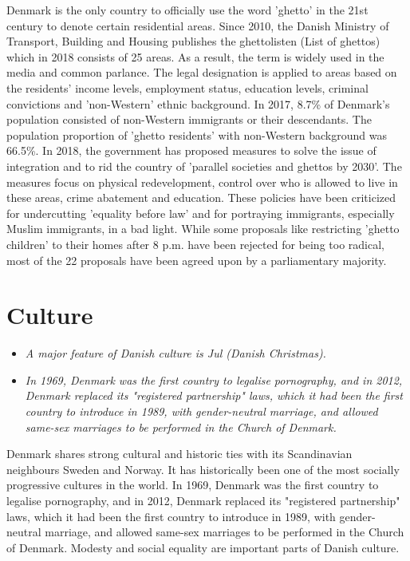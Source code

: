 Denmark is the only country to officially use the word 'ghetto' in the
21st century to denote certain residential areas. Since 2010, the Danish
Ministry of Transport, Building and Housing publishes the ghettolisten
(List of ghettos) which in 2018 consists of 25 areas. As a result, the
term is widely used in the media and common parlance. The legal
designation is applied to areas based on the residents' income levels,
employment status, education levels, criminal convictions and
'non-Western' ethnic background. In 2017, 8.7\% of Denmark's population
consisted of non-Western immigrants or their descendants. The population
proportion of 'ghetto residents' with non-Western background was 66.5\%.
In 2018, the government has proposed measures to solve the issue of
integration and to rid the country of 'parallel societies and ghettos by
2030'. The measures focus on physical redevelopment, control over who is
allowed to live in these areas, crime abatement and education. These
policies have been criticized for undercutting 'equality before law' and
for portraying immigrants, especially Muslim immigrants, in a bad light.
While some proposals like restricting 'ghetto children' to their homes
after 8 p.m. have been rejected for being too radical, most of the 22
proposals have been agreed upon by a parliamentary majority.

\section{Culture}\label{culture}

\begin{itemize}
\item
  \emph{A major feature of Danish culture is Jul (Danish Christmas).}
\item
  \emph{In 1969, Denmark was the first country to legalise pornography,
  and in 2012, Denmark replaced its "registered partnership" laws, which
  it had been the first country to introduce in 1989, with
  gender-neutral marriage, and allowed same-sex marriages to be
  performed in the Church of Denmark.}
\end{itemize}

Denmark shares strong cultural and historic ties with its Scandinavian
neighbours Sweden and Norway. It has historically been one of the most
socially progressive cultures in the world. In 1969, Denmark was the
first country to legalise pornography, and in 2012, Denmark replaced its
"registered partnership" laws, which it had been the first country to
introduce in 1989, with gender-neutral marriage, and allowed same-sex
marriages to be performed in the Church of Denmark. Modesty and social
equality are important parts of Danish culture.

